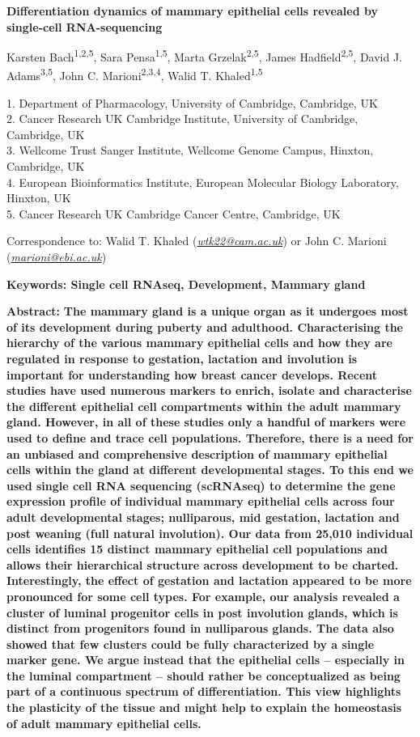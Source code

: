 \documentclass[titlepage, 12pt, oneside]{amsart}
\begin{document}
\begin{titlepage}
\large
\textbf{Differentiation dynamics of mammary epithelial cells revealed by single-cell RNA-sequencing}
\normalsize

\small
Karsten Bach\textsuperscript{1,2,5}, Sara Pensa\textsuperscript{1,5},
Marta Grzelak\textsuperscript{2,5}, James Hadfield\textsuperscript{2,5},
David J. Adams\textsuperscript{3,5}, John C.
Marioni\textsuperscript{2,3,4}, Walid T. Khaled\textsuperscript{1,5 }

1. Department of Pharmacology, University of Cambridge, Cambridge, UK\\
2. Cancer Research UK Cambridge Institute, University of Cambridge,
Cambridge, UK\\
3. Wellcome Trust Sanger Institute, Wellcome Genome Campus, Hinxton,
Cambridge, UK\\
4. European Bioinformatics Institute, European Molecular Biology
Laboratory, Hinxton, UK\\
5. Cancer Research UK Cambridge Cancer Centre, Cambridge, UK

Correspondence to: Walid T. Khaled
(\href{mailto:wtk22@cam.ac.uk}{\emph{wtk22@cam.ac.uk}}) or John C.
Marioni (\href{mailto:marioni@ebi.ac.uk}{\emph{marioni@ebi.ac.uk}})

\normalsize
\textbf{Keywords: Single cell RNAseq, Development, Mammary gland }
\end{titlepage}
\onehalfspacing
\textbf{Abstract:}
\textbf{The mammary gland is a unique organ as it undergoes most of its development during puberty and adulthood.
Characterising the hierarchy of the various mammary epithelial cells and how they are regulated in response to gestation, lactation and involution is important for understanding how breast cancer develops.
Recent studies have used numerous markers to enrich, isolate and characterise the different epithelial cell compartments within the adult mammary gland.
However, in all of these studies only a handful of markers were used to define and trace cell populations.
Therefore, there is a need for an unbiased and comprehensive description of mammary epithelial cells within the gland at different developmental stages.
To this end we used single cell RNA sequencing (scRNAseq) to determine the gene expression profile of individual mammary epithelial cells across four adult developmental stages; nulliparous, mid gestation, lactation and post weaning (full natural involution).
Our data from 25,010 individual cells identifies 15 distinct mammary epithelial cell populations and allows their hierarchical structure across development to be charted.
Interestingly, the effect of gestation and lactation appeared to be more pronounced for some cell types.
For example, our analysis revealed a cluster of luminal progenitor cells in post involution glands, which is distinct from progenitors found in nulliparous glands.
The data also showed that few clusters could be fully characterized by a single marker gene.
We argue instead that the epithelial cells -- especially in the luminal compartment -- should rather be conceptualized as being part of a continuous spectrum of differentiation.
This view highlights the plasticity of the tissue and might help to explain the homeostasis of adult mammary epithelial cells.}
\newpage
\end{document}
